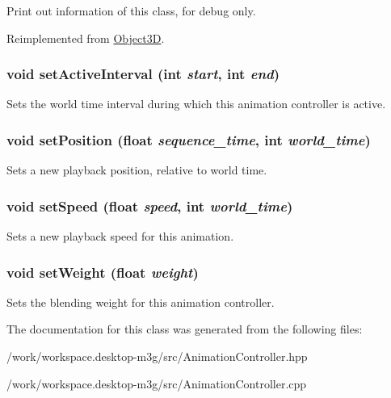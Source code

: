 Print out information of this class, for debug only. 

Reimplemented from \hyperlink{classm3g_1_1Object3D_6fea17fa1532df3794f8cb39cb4f911f}{Object3D}.\hypertarget{classm3g_1_1AnimationController_a4cba877288d7a188477e0a756fd2f58}{
\subsubsection[{setActiveInterval}]{\setlength{\rightskip}{0pt plus 5cm}void setActiveInterval (int {\em start}, \/  int {\em end})}}
\label{classm3g_1_1AnimationController_a4cba877288d7a188477e0a756fd2f58}


Sets the world time interval during which this animation controller is active. \hypertarget{classm3g_1_1AnimationController_da0d7a404b2a75ee182ca6351cf673d5}{
\subsubsection[{setPosition}]{\setlength{\rightskip}{0pt plus 5cm}void setPosition (float {\em sequence\_\-time}, \/  int {\em world\_\-time})}}
\label{classm3g_1_1AnimationController_da0d7a404b2a75ee182ca6351cf673d5}


Sets a new playback position, relative to world time. \hypertarget{classm3g_1_1AnimationController_b32791d1a51df9ac8028792a841d06a6}{
\subsubsection[{setSpeed}]{\setlength{\rightskip}{0pt plus 5cm}void setSpeed (float {\em speed}, \/  int {\em world\_\-time})}}
\label{classm3g_1_1AnimationController_b32791d1a51df9ac8028792a841d06a6}


Sets a new playback speed for this animation. \hypertarget{classm3g_1_1AnimationController_8859df4d5a61714012bf9e1240189aed}{
\subsubsection[{setWeight}]{\setlength{\rightskip}{0pt plus 5cm}void setWeight (float {\em weight})}}
\label{classm3g_1_1AnimationController_8859df4d5a61714012bf9e1240189aed}


Sets the blending weight for this animation controller. 

The documentation for this class was generated from the following files:\begin{CompactItemize}
\item 
/work/workspace.desktop-m3g/src/AnimationController.hpp\item 
/work/workspace.desktop-m3g/src/AnimationController.cpp\end{CompactItemize}
